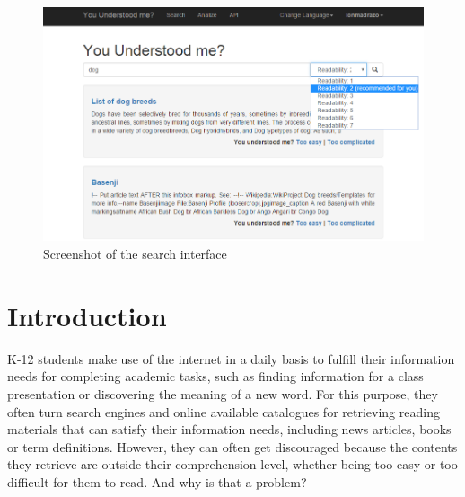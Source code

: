\documentclass{sig-alternate-05-2015}
\begin{document}





%
%

%
%
\printccsdesc


\\\\\\\\

\begin{figure}[ht]
 \centering
  \includegraphics[width=1\textwidth]{SearchScreenshot2}
 \caption{Screenshot of the search interface}
 \end{figure}
\section{Introduction}

K-12 students make use of the internet in a daily basis to fulfill their information needs for completing academic tasks, such as finding information for a class presentation or discovering the meaning of a new word. For this purpose, they often turn search engines and online available catalogues for retrieving reading materials that can satisfy their information needs, including news articles, books or term definitions. However, they can often get discouraged because the contents they retrieve are outside their comprehension level, whether being too easy or too difficult  for them to read. {\color{red}And why is that a problem?}\\
\end{document}

